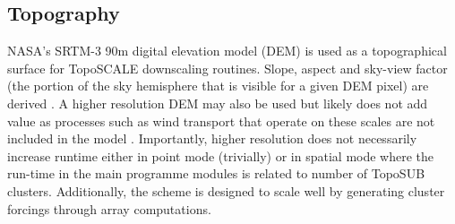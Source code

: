 \documentclass[hess, manuscript]{copernicus}
\begin{document}
\subsection{Topography}
NASA's SRTM-3 90\unit{m} digital elevation model (DEM) is used as a topographical surface for TopoSCALE downscaling routines. Slope, aspect and sky-view factor (the portion of the sky hemisphere that is visible for a given DEM pixel) are derived \citep{Dozier1990-jp}. A higher resolution DEM may also be used but likely does not add value as processes such as wind transport that operate on these scales are not included in the model \citep{Mott2018-pt}. Importantly, higher resolution does not necessarily increase runtime either in point mode (trivially) or in spatial mode where the run-time in the main programme modules is related to number of TopoSUB clusters. Additionally, the scheme is designed to scale well by generating cluster forcings through array computations.


\end{document}
